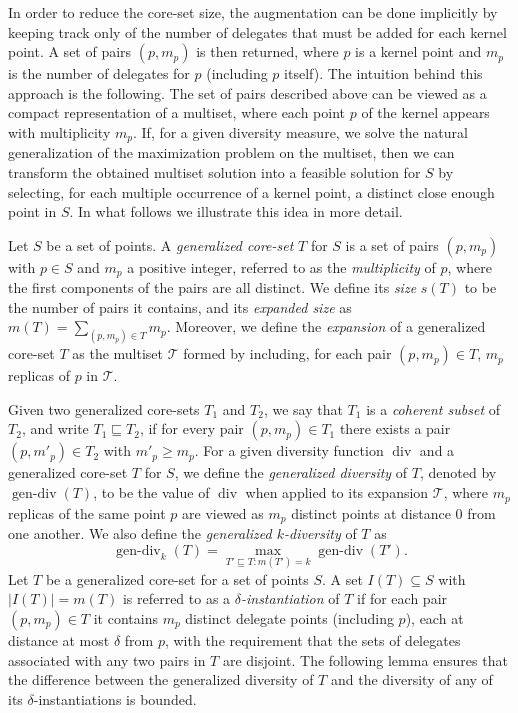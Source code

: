 \documentclass{article}
\DeclareMathOperator{\diversity}{div}
\DeclareMathOperator{\gendiv}{gen-div}
\begin{document}
In order to reduce the core-set size, the augmentation can be done
implicitly by keeping track only of the number of delegates that must
be added for each kernel point. A set of pairs $(p, m_p)$ is then
returned, where $p$ is a kernel point and $m_p$ is the number of
delegates for $p$ (including $p$ itself).
The intuition behind this approach is the following. The set of pairs
described above can be viewed as a compact representation of a
multiset, where each point $p$ of the kernel appears with multiplicity
$m_p$. If, for a given diversity measure, we solve the natural
generalization of the maximization problem on the multiset, then we
can transform the obtained multiset solution into a feasible solution
for $S$ by selecting, for each multiple occurrence of a kernel point,
a distinct close enough point in $S$.  In what follows we illustrate
this idea in more detail.

Let $S$ be a set of points. A \emph{generalized core-set} $T$ for $S$
is a set of pairs $(p,m_p)$ with $p \in S$ and $m_p$ a positive
integer, referred to as the \emph{multiplicity} of $p$, where the
first components of the pairs are all distinct. We define its
\emph{size} $s(T)$ to be the number of pairs it contains, and its
\emph{expanded size} as $m(T) = \sum_{(p,m_p) \in T} m_p$.
Moreover, we define the \emph{expansion} of a generalized core-set $T$
as the multiset $\mathcal{T}$ formed by including, for each pair
$(p, m_p)\in T$, $m_p$ replicas of $p$ in $\mathcal{T}$.

Given two generalized core-sets $T_1$ and $T_2$, we say that $T_1$ is
a \emph{coherent subset} of $T_2$, and write $T_1 \sqsubseteq T_2$, if
for every pair $(p,m_p) \in T_1$ there exists a pair
$(p,m'_p) \in T_2$ with $m'_p \geq m_p$. For a given diversity
function $\diversity$ and a generalized core-set $T$ for $S$, we
define the \emph{generalized diversity} of $T$, denoted by
$\gendiv(T)$, to be the value of $\diversity$ when applied to its
expansion $\mathcal{T}$, where $m_p$ replicas of the same point $p$
are viewed as $m_p$ distinct points at distance 0 from one another.
We also define the \emph{generalized $k$-diversity} of $T$ as
\[
\gendiv_k(T) = \max_{T' \sqsubseteq T : m(T')=k} \gendiv(T').
\]
Let $T$ be a generalized core-set for a set of points $S$. A set
$I(T) \subseteq S$ with $|I(T)|=m(T)$ is referred to as a
\emph{${\delta}$-instantiation} of $T$ if for each pair $(p,m_p) \in T$
it contains $m_p$ distinct delegate points (including $p$), each at
distance at most ${\delta}$ from $p$, with the requirement that the sets
of delegates associated with any two pairs in $T$ are disjoint. The
following lemma
ensures that the difference between the generalized
diversity of $T$ and the diversity of any of its
${\delta}$-instantiations is bounded.
 
\end{document}
